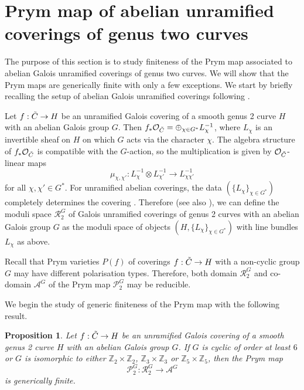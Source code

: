 \documentclass{amsart}
\newtheorem{prop}[thm]{Proposition}
\theoremstyle{remark}
\numberwithin{equation}{section}
\newcommand{\tC}{\Tilde{C}}
\begin{document}
\section{Prym map of abelian unramified coverings of genus two curves}

The purpose of this section is to study finiteness of the Prym map associated to abelian Galois unramified coverings of genus two curves. We will show that the Prym maps are generically finite with only a few exceptions. We start by briefly recalling the setup of abelian  Galois unramified coverings following \cite{Pardini, Mohajer}. 

Let $f: \tC \to H$ be an unramified Galois covering of a smooth genus 2 curve $H$ with an abelian Galois group $G$. Then \(f_*\mathcal{O}_{\tC} = \oplus_{\chi \in G^*} L_{\chi}^{-1}\), where \(L_{\chi}\) is an invertible sheaf on $H$ on which $G$ acts via the character \(\chi\). The algebra structure of $f_*\mathcal{O}_{\tC}$ is compatible with the \(G\)-action, so the multiplication is given by \(\mathcal{O}_{\tC}\)-linear maps $$\mu_{\chi, \chi'}: L_{\chi}^{-1} \otimes L_{\chi'}^{-1} \to L_{\chi\chi'}^{-1}$$ for all \(\chi, \chi' \in G^*\). For unramified abelian coverings, the data \((\{L_{\chi}\}_{\chi \in G^*})\) completely determines the covering \cite[Theorem 2.1]{Pardini}. Therefore (see also \cite[Proposition 2.3]{Mohajer}), we can define the moduli space \(\mathcal{R}_2^G\) of Galois unramified coverings of genus 2 curves with an abelian Galois group $G$ as the moduli space of objects \((H, \{L_{\chi}\}_{\chi \in G^*})\) with line bundles $L_{\chi}$ as above.

Recall that Prym varieties $P(f)$ of coverings $f: \tC \to H$ with a non-cyclic group $G$ may have different polarisation types. Therefore, both domain \(\mathcal{R}_2^G\) and co-domain $\mathcal{A}^G$ of the Prym map $\mathcal{P}_2^G$ may be reducible.

We begin the study of generic finiteness of the Prym map with the following result.

\begin{prop}
\label{smallgroups}
    Let \(f: \tC \to H\) be an unramified Galois covering of a smooth genus 2 curve $H$ with an abelian Galois group \(G\). If $G$ is cyclic of order at least $6$ or $G$ is isomorphic to either $\mathbb{Z}_2 \times \mathbb{Z}_2$, $\mathbb{Z}_3 \times \mathbb{Z}_3$ or $\mathbb{Z}_5 \times \mathbb{Z}_5$, then the Prym map $$\mathcal{P}_2^{G}: \mathcal{R}_2^{G} \to \mathcal{A}^{G}$$ is generically finite. 
\end{prop}
\end{document}
